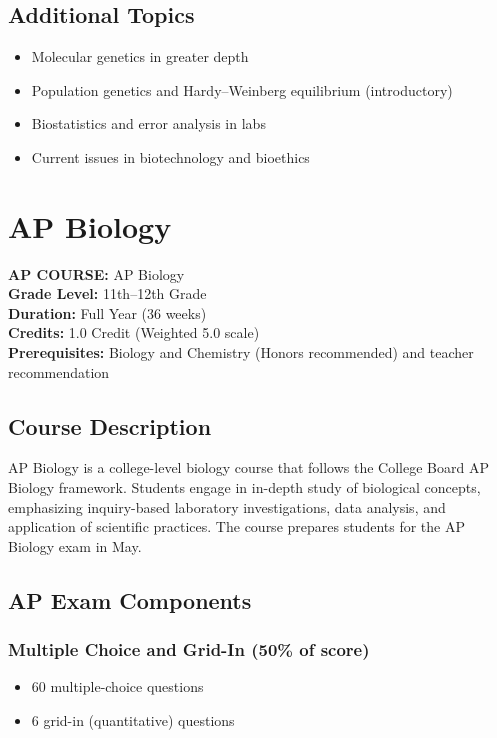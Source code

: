 \documentclass[12pt,oneside]{book}
\begin{document}
\section{Additional Topics}
\begin{itemize}[leftmargin=2em]
    \item Molecular genetics in greater depth
    \item Population genetics and Hardy--Weinberg equilibrium (introductory)
    \item Biostatistics and error analysis in labs
    \item Current issues in biotechnology and bioethics
\end{itemize}

\chapter{AP Biology}

\noindent\textbf{AP COURSE:} AP Biology\\
\textbf{Grade Level:} 11th--12th Grade\\
\textbf{Duration:} Full Year (36 weeks)\\
\textbf{Credits:} 1.0 Credit (Weighted 5.0 scale)\\
\textbf{Prerequisites:} Biology and Chemistry (Honors recommended) and teacher recommendation

\section{Course Description}
AP Biology is a college-level biology course that follows the College Board AP Biology framework.
Students engage in in-depth study of biological concepts, emphasizing inquiry-based laboratory
investigations, data analysis, and application of scientific practices. The course prepares students
for the AP Biology exam in May.

\section{AP Exam Components}
\subsection*{Multiple Choice and Grid-In (50\% of score)}
\begin{itemize}[leftmargin=2em]
    \item 60 multiple-choice questions
    \item 6 grid-in (quantitative) questions
\end{itemize}
\end{document}
